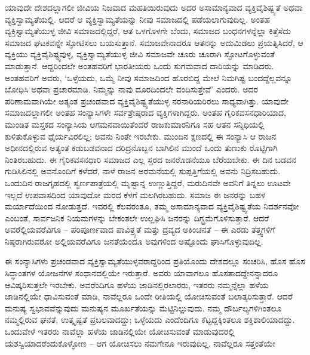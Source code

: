 ಯಾವುದೇ ದೇಶದಲ್ಲಾಗಲೀ ಜೀವಿಯ ನಿಜವಾದ ಮಹತಿಯಿರುವುದು ಅದರ ಅಸಾಮಾನ್ಯವಾದ ವ್ಯಕ್ತಿವೈಶಿಷ್ಟ್ಯತೆ ಅಥವಾ ವ್ಯಕ್ತಿಸ್ವಾಮ್ಯತೆಯಲ್ಲಿ. ಆದರೆ ಆ ವ್ಯಕ್ತಿಸ್ವಾಮ್ಯತೆಯನ್ನು ನೀವು ಸಮಾಜದಲ್ಲಿ ಪಡೆಯಲಾಗುವುದಿಲ್ಲ. ಅಂತಹ ವ್ಯಕ್ತಿಸ್ವಾಮ್ಯತೆಯುಳ್ಳ ಜೀವಿ ಸಮಾಜದಲ್ಲಿದ್ದರೆ, ಆತ ಒಳಗೊಳಗೇ ಬೆಂದು, ಸಮಾಜದ ಬಂಧನಗಳನ್ನೆಲ್ಲಾ ಕಿತ್ತೆಸೆದು ಸಮಾಜದ ಘಟಕವನ್ನೇ ಸ್ಫೋಟಿಸಲು ಬಯಸುತ್ತಾನೆ. ಸಮಾಜವೇನಾದರೂ ಆತನನ್ನು ಅದುಮಿಡಲು ಪ್ರಯತ್ನಿಸಿದರೆ, ಆ ವ್ಯಕ್ತಿಯು ವ್ಯಕ್ತಿವೈಶಿಷ್ಟ್ಯವುಳ್ಳ, ವ್ಯಕ್ತಿಸ್ವಾಮ್ಯತೆಯುಳ್ಳ ಜೀವಿ ಸಮಾಜವೇ ಚೂರು ಚೂರಾಗಿ ಸ್ಫೋಟಗೊಳ್ಳುವಂತೆ ಮಾಡುತ್ತಾನೆ. ಆದ್ದರಿಂದಲೇ ಅಂತಹವರಿಗೆ ಭಾರತೀಯರು ಒಂದು ಸುಗಮವಾದ ದಾರಿಯನ್ನು ಮಾಡಿದರು. ಅಂತಹವರಿಗೆ ಅವರು, ‘ಒಳ್ಳೆಯದು, ಒಮ್ಮೆ ನೀವು ಸಮಾಜದಿಂದ ಹೊರಬಿದ್ದ ಮೇಲೆ ನಿಮಗಿಷ್ಟ ಬಂದದ್ದೆಲ್ಲವನ್ನೂ ಬೋಧಿಸಿ ಅಥವಾ ಪ್ರಚಾರಮಾಡಿ. ನಿಮ್ಮನ್ನು ನಾವು ದೂರದಿಂದಲೇ ವಂದಿಸುತ್ತೇವೆ’ ಎಂದರು. ಅದರ ಪರಿಣಾಮವಾಗಿಯೇ ಅತ್ಯಂತ ಪ್ರಚಂಡವಾದ ವ್ಯಕ್ತಿವೈಶಿಷ್ಟ್ಯತೆಯುಳ್ಳ ನರನಾರಿಯರಿರಲು ಸಾಧ್ಯವಾಗಿತ್ತು. ಯಾವುದೇ ಸಮಾಜದಲ್ಲಾಗಲೀ ಅಂತಹ ಸಂನ್ಯಾಸಿಗಳೇ ಸರ್ವಶ್ರೇಷ್ಠರಾದ ವ್ಯಕ್ತಿಗಳಾಗಿದ್ದರು. ಅಂತಹ ಗೈರಿಕವಸನಧಾರಿಯಾದ, ಮುಂಡಿತ ಮಸ್ತಕದ ಸಂನ್ಯಾಸಿಯ ಆಗಮನವಾಯಿತೆಂದರೆ ರಾಜಕುಮಾರನಿಗೂ ಸಹ ಆತನ ಸನ್ನಿಧಿಯಲ್ಲಿ ಕುಳಿತುಕೊಳ್ಳುವ ಧೈರ್ಯವಿರಲಿಲ್ಲ; ಅವನು ನಿಂತೇ ಇರಬೇಕು. ಮುಂದಿನ ಕ್ಷಣದಲ್ಲಿ ಈ ಸಂನ್ಯಾಸಿ ಆ ರಾಜನ ಅಧೀನದಲ್ಲಿರುವ ಅತ್ಯಂತ ಕಡುಬಡವನಾದ ದರಿದ್ರನೊಬ್ಬನ ಬಾಗಿಲಿನ ಮುಂದೆ ಒಂದು ತುಣುಕು ರೊಟ್ಟಿಗಾಗಿ ನಿಂತಿರಬಹುದು. ಈ ಗೈರಿಕವಸನಧಾರಿ ಸಮಾಜದ ಎಲ್ಲ ಸ್ತರದ ಜನರೊಡನೆಯೂ ಬೆರೆಯಬೇಕು. ಈ ದಿನ ಬಡವನ ಗುಡಿಸಿಲಿನಲ್ಲಿ ಅವನೊಂದಿಗೆ ಕಳೆದರೆ, ನಾಳೆ ರಾಜನ ಅರಮನೆಯಲ್ಲಿ ಸುಪ್ಪತ್ತಿಗೆಯಲ್ಲಿ ಅವನು ನಿದ್ರಿಸಬಹುದು. ಒಂದುದಿನ ರಾಜಗೃಹದಲ್ಲಿ ಸ್ವರ್ಣಪಾತ್ರೆಯಲ್ಲಿ ಮೃಷ್ಟಾನ್ನ ಉಣ್ಣುತ್ತಿದ್ದರೆ, ಮರುದಿನವೇ ಅವನಿಗೆ ತಿನ್ನಲು ಊಟವೇ ಇಲ್ಲದೆ ಉಪವಾಸದಿಂದ ಯಾವುದೋ ಮರದ ಕೆಳಗೆ ಮಲಗಿರಬಹುದು. ಸಮಾಜ ಈ ಜನರನ್ನು ಬಹಳ ಮರ್ಯಾದೆಯಿಂದ ನೋಡುತ್ತದೆ. ಇವರಲ್ಲಿ ಕೆಲವರಂತೂ, ತಮ್ಮ ಅಸಾಮಾನ್ಯವಾದ ವ್ಯಕ್ತಿವೈಶಿಷ್ಟ್ಯತೆಯ ನಿದರ್ಶನವೋ ಎಂಬಂತೆ, ಸಾರ್ವಜನಿಕ ನಿಯಮಗಳನ್ನು ಬೇಕಂತಲೇ ಉಲ್ಲಘಿಸಿ ಜನರನ್ನು ದಿಗ್ಭ್ರಮೆಗೊಳಿಸುತ್ತಾರೆ. ಆದರೆ ಅವರೆಲ್ಲಿಯವರೆವಿಗೂ – ಪರಿಪೂರ್ಣವಾದ ಪಾವಿತ್ರ್ಯತೆ ಮತ್ತು ದ್ರವ್ಯದ ಅಕಿಂಚನತೆ – ಈ ಎರಡು ತತ್ತ್ವಗಳಿಗೆ ನಿಷ್ಠರಾಗಿರುವರೋ ಅಲ್ಲಿಯವರೆವಿಗೂ ಜನತೆಯೆಂದೂ ಅವುಗಳಿಂದ ಅಷ್ಟೊಂದು ಘಾಸಿಗೊಳ್ಳುವುದಿಲ್ಲ.

ಈ ಸಂನ್ಯಾಸಿಗಳು ಪ್ರಚಂಡವಾದ ವ್ಯಕ್ತಿಸ್ವಾಮ್ಯತೆಯುಳ್ಳವರಾದ್ದರಿಂದ ಪ್ರತಿಯೊಂದು ದೇಶದಲ್ಲೂ ಸಂಚರಿಸಿ, ಹೊಸ ಹೊಸ ಸಿದ್ಧಾಂತಗಳ ಯೋಜನೆಗಳ ಸಂಧಾನದಲ್ಲಿಯೇ ಇರುತ್ತಾರೆ. ಅವರು ಯಾವಾಗಲೂ ಹೊಸತಾದದ್ದೇನನ್ನಾದರೂ ಆವಿಷ್ಕರಿಸುತ್ತಲೇ ಇರಬೇಕು. ಅವರೆಂದಿಗೂ ಹಳೆಯ ಜಾಡಿನಲ್ಲಿರಲಾರರು, ಇತರರು ನಮ್ಮನ್ನೆಲ್ಲಾ ಹಳೆಯ ಜಾಡಿನಲ್ಲಿಯೇ ಧಾವಿಸುವಂತೆ ಮಾಡಿ, ನಾವೆಲ್ಲರೂ ಒಂದೇ ರೀತಿಯಲ್ಲಿ ಯೋಚಿಸುವಂತೆ ಬಲಾತ್ಕರಿಸುತ್ತಾರೆ. ಆದರೆ ಮನುಷ್ಯ ಸ್ವಭಾವವೆನ್ನುವುದು ಮನುಷ್ಯನ ಮೂರ್ಖತೆಯನ್ನು ಮೆಟ್ಟಿನಿಲ್ಲುವುದು. ನಮ್ಮ ದೌರ್ಬಲ್ಯಗಳಿಗಿಂತಲೂ ನಮ್ಮಲ್ಲಿರುವ ಘನತೆ, ಉತ್ಕೃಷ್ಟತೆ ಪ್ರಬಲವಾದದ್ದು; ಒಳ್ಳೆಯದು ಎಂದೆಂದಿಗೂ ಕೆಟ್ಟದ್ದಕ್ಕಿಂತಲೂ ಶಕ್ತಿಶಾಲಿಯಾದದ್ದು. ಒಂದುವೇಳೆ ಇತರರು ನಾವೆಲ್ಲಾ ಹಳೆಯ ಜಾಡಿನಲ್ಲಿಯೇ ಯೋಚಿಸುವಂತೆ ಮಾಡುವುದರಲ್ಲಿ ಯಶಸ್ವಿಯಾದರೆಂದುಕೊಳ್ಳೋಣ – ಆಗ ಯೋಚಿಸಲು ನಮಗೇನೂ ಇರುವುದಿಲ್ಲ. ನಾವೆಲ್ಲರೂ ಸತ್ತಂತೆಯೇ

